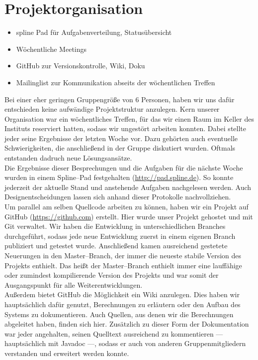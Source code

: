 \section{Projektorganisation}
    \begin{itemize}
        \item spline Pad für Aufgabenverteilung, Statusübersicht
        \item Wöchentliche Meetings
        \item GitHub zur Versionskontrolle, Wiki, Doku
        \item Mailinglist zur Kommunikation abseits der wöchentlichen Treffen
    \end{itemize}
    
Bei einer eher geringen Gruppengröße von 6 Personen, haben wir uns dafür entschieden keine aufwändige Projektstruktur anzulegen. Kern unserer Organisation war ein wöchentliches Treffen, für das wir einen Raum im Keller des Instituts reserviert hatten, sodass wir ungestört arbeiten konnten. Dabei stellte jeder seine Ergebnisse der letzten Woche vor. Dazu gehörten auch eventuelle Schwierigkeiten, die anschließend in der Gruppe diskutiert wurden. Oftmals entstanden dadruch neue Lösungsansätze.\\
Die Ergebnisse dieser Besprechungen und die Aufgaben für die nächste Woche wurden in einem Spline--Pad festgehalten (\url{http://pad.spline.de}). So konnte jederzeit der aktuelle Stand und anstehende Aufgaben nachgelesen werden. Auch Designentscheidungen lassen sich anhand dieser Protokolle nachvollziehen.\\
Um parallel am selben Quellcode arbeiten zu können, haben wir ein Projekt auf GitHub (\url{https://github.com}) erstellt. Hier wurde unser Projekt gehostet und mit Git verwaltet. Wir haben die Entwicklung in unterschiedlichen Branches durchgeführt, sodass jede neue Entwicklung zuerst in einem eigenen Branch publiziert und getestet wurde. Anschließend kamen ausreichend gestetete Neuerungen in den Master--Branch, der immer die neueste stabile Version des Projekts enthielt. Das heißt der Master--Branch enthielt immer eine lauffähige oder zumindest kompilierende Version des Projekts und war somit der Ausgangspunkt für alle Weiterentwicklungen.\\
Außerdem bietet GitHub die Möglichkeit ein Wiki anzulegen. Dies haben wir hauptsächlich dafür genutzt, Berechnungen zu erläutern oder den Aufbau des Systems zu dokumentieren. Auch Quellen, aus denen wir die Berechnungen abgeleitet haben, finden sich hier. Zusätzlich zu dieser Form der Dokumentation war jeder angehalten, seinen Quelltext ausreichend zu kommentieren --- hauptsächlich mit Javadoc ---, sodass er auch von anderen Gruppenmitgliedern verstanden und erweitert werden konnte.\\

